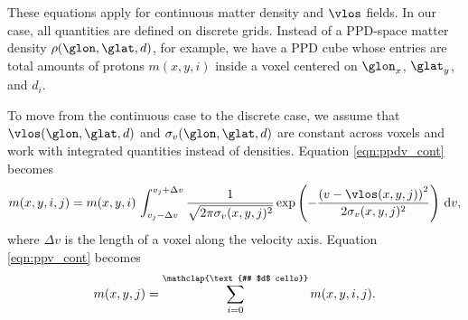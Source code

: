 These equations apply for continuous matter density and $\vlos$ fields.
In our case, all quantities are defined on discrete grids. 
Instead of a PPD-space matter density $\rho(\glon, \glat, d)$, for example, we have a PPD cube whose entries are total amounts of protons $m(x, y, i)$ inside a voxel centered on $\glon_x$, $\glat_y$, and $d_i$.

To move from the continuous case to the discrete case, we assume that $\vlos(\glon, \glat, d)$ and $\sigma_v(\glon, \glat, d)$ are constant across voxels and work with integrated quantities instead of densities. 
Equation \ref{eqn:ppdv_cont} becomes
\begin{equation}
  \label{eqn:ppdv_disc}
  m(x, y, i, j) = m(x, y, i) \, \int_{v_j - \Delta v}^{v_j + \Delta v} 
 \frac{1}{\sqrt{2 \pi \sigma_v(x, y, j)^2}}
    \exp\left(- \frac{\left( v - \vlos(x, y, j) \right)^2}{2 \sigma_v(x, y, j)^2} \right)\, {\rm d}v,
\end{equation}
where $\Delta v$ is the length of a voxel along the velocity axis.
Equation \ref{eqn:ppv_cont} becomes
\begin{equation}
  \label{eqn:ppv_disc}
  m(x, y, j) = \sum_{i=0}^\mathclap{\text{# $d$ cells}} m(x, y, i, j).
\end{equation}



